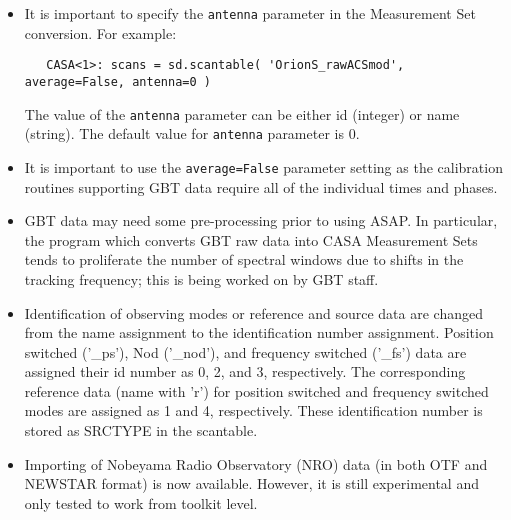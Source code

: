 \begin{itemize}

\item It is important to specify the {\tt antenna} parameter in the Measurement Set conversion.
 For example:

\begin{verbatim}
   CASA<1>: scans = sd.scantable( 'OrionS_rawACSmod', average=False, antenna=0 )
\end{verbatim}
 
 The value of the {\tt antenna} parameter can be either id (integer) or name
 (string). The default value for {\tt antenna} parameter is 0.

\item It is important to use the {\tt average=False} parameter
setting as the calibration routines supporting GBT data require all of
the individual times and phases.

\item GBT data may need some pre-processing prior to using
ASAP. In particular, the program which converts GBT raw data into CASA
Measurement Sets tends to proliferate the number of spectral windows
due to shifts in the tracking frequency; this is being worked on by
GBT staff. 

%
\item  Identification of observing modes or reference and source data are
 changed from the name assignment to the identification number
 assignment. Position switched ('\_ps'), Nod ('\_nod'), and  frequency
 switched ('\_fs') data are assigned their id number as 0, 2, and 3,
 respectively. The corresponding reference data (name with 'r') for position
 switched and frequency switched modes are assigned as 1 and 4,
 respectively. These identification number is stored as SRCTYPE in
 the scantable.

\item  Importing of Nobeyama Radio Observatory (NRO) data (in both OTF and NEWSTAR format)
 is now available. However, it is still experimental and only tested to work from toolkit level.
\end{itemize}

